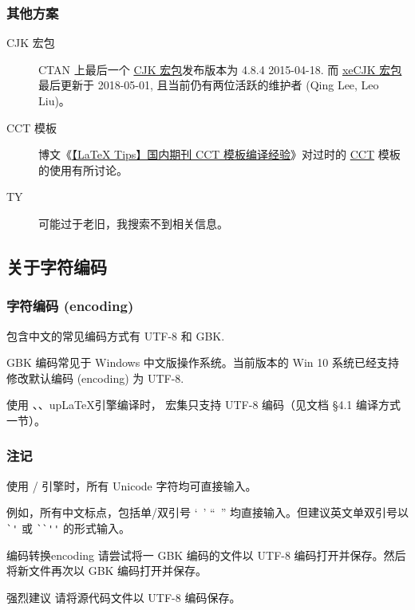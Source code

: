 \documentclass[final,aspectratio=169]{ctexbeamer}
\begin{document}
\begin{frame}
\frametitle{其他方案}
\begin{description}
\item[CJK 宏包] CTAN 上最后一个 \href{https://www.ctan.org/pkg/cjk}{CJK 宏包}发布版本为 4.8.4 2015-04-18. 而 \href{https://www.ctan.org/pkg/xecjk}{xeCJK 宏包}最后更新于 2018-05-01, 且当前仍有两位活跃的维护者 (Qing Lee, Leo Liu)。
\item[CCT 模板] 博文《\href{https://liam.page/2013/10/15/LaTeX-CCT-template/}{【LaTeX Tips】国内期刊 CCT 模板编译经验}》对过时的 \href{ftp://ftp.cc.ac.cn/pub/cct/}{CCT} 模板的使用有所讨论。
\item[TY] 可能过于老旧，我搜索不到相关信息。
\end{description}
\end{frame}

\subsection{关于字符编码}
\begin{frame}
\frametitle{字符编码 (encoding)}
包含中文的常见编码方式有 UTF-8 和 GBK.

GBK 编码常见于 Windows 中文版操作系统。当前版本的 Win 10 系统已经支持修改默认编码 (encoding) 为 UTF-8.

使用 、、up\LaTeX 引擎编译时， \CTeX 宏集只支持 UTF-8 编码（见文档 \cite{ctex} \S 4.1 编译方式一节）。
\end{frame}

\begin{frame}[fragile]
\frametitle{注记}
使用 / 引擎时，所有 Unicode 字符均可直接输入。

例如，所有中文标点，包括单/双引号 ‘\, ’ “\, ” 均直接输入。但建议英文单双引号以 \verb|`'| 或 \verb|``''| 的形式输入。

\begin{Ex}{编码转换}{encoding}
请尝试将一 GBK 编码的文件以 UTF-8 编码打开并保存。然后将新文件再次以 GBK 编码打开并保存。
\end{Ex}
\begin{alertblock}{强烈建议}
请将源代码文件以 UTF-8 编码保存。
\end{alertblock}
\end{frame}
\end{document}
